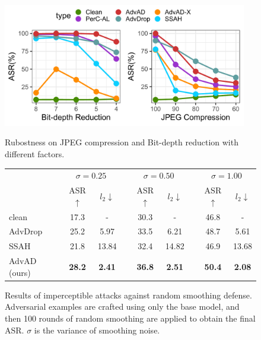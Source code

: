 \documentclass{article}
\begin{document}
\begin{figure}[t]
    \centering
    \begin{minipage}[t]{0.45\textwidth}
        \includegraphics[width=0.95\textwidth]{figures/Rplot10.pdf}
        \caption{Rubostness on JPEG compression and Bit-depth reduction with different factors.}
        \label{fig:3}
    \vspace{-0.2599cm}
    \end{minipage}
    \hfill
    \begin{minipage}[t]{0.5\textwidth}
    \vspace{-3cm}
    \centering
    \captionsetup{type=table}
    \caption{Results of imperceptible attacks against random smoothing defense.  Adversarial examples are crafted using only the base model, and then 100 rounds of random smoothing are applied to obtain the final ASR. $\sigma$ is the variance of smoothing noise.}
    \setlength{\tabcolsep}{3pt}
    \label{tab:tab21}
    \scriptsize
    \begin{tabular}{lcccccccc}
    \toprule
                    &   \multicolumn{2}{c}{$\sigma=0.25$} & &  \multicolumn{2}{c}{$\sigma=0.50$} & &  \multicolumn{2}{c}{$\sigma=1.00$}        \\
    \cmidrule{2-3} \cmidrule{5-6} \cmidrule{8-9}
                    & ASR$\uparrow$ & $l_2$$\downarrow$ & & ASR$\uparrow$ & $l_2$$\downarrow$ & & ASR$\uparrow$ & $l_2$$\downarrow$  \\
    \midrule
        clean       &   17.3    &   -   & &   30.3    &   -   & &   46.8    &   -  \\
        AdvDrop     &   25.2    &   5.97   & &   33.5    &   6.21   & &   48.7    &   5.61  \\
        SSAH        &   21.8    &   13.84   & &   32.4    &   14.82   & &   46.9    &   13.68  \\
        AdvAD (ours)&   \textbf{28.2}    &   \textbf{2.41}   & &   \textbf{36.8}    &   \textbf{2.51}   & &   \textbf{50.4}    &   \textbf{2.08}  \\
    \bottomrule
    \end{tabular}
    \label{tab:my_label}
    \end{minipage}
    \vspace{-0.2599cm}
\end{figure}
    
\end{document}
